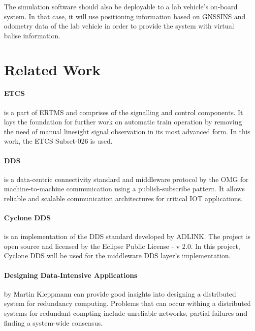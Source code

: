 \documentclass[a4paper, 12pt]{scrartcl}
\begin{document}
The simulation software should also be deployable to a lab vehicle's on-board system.
In that case, it will use positioning information based on \ac{GNSSINS} and odometry data of the lab vehicle in order to provide the system with virtual balise information.

\section*{Related Work}
\paragraph{\ac{ETCS}} is a part of \ac{ERTMS} and comprises of the signalling and control components.
It lays the foundation for further work on automatic train operation by removing the need of manual linesight signal observation in its most advanced form.
In this work, the \ac{ETCS} Subset-026 is used.
\vspace{-0.4cm}
\paragraph{\ac{DDS}} is a data-centric connectivity standard and middleware protocol by the \ac{OMG} for machine-to-machine communication using a publish-subscribe pattern.
It allows reliable and scalable communication architectures for critical \ac{IOT} applications.
\vspace{-0.4cm}
\paragraph{Cyclone DDS} is an implementation of the \ac{DDS} standard developed by ADLINK.
The project is open source and licensed by the Eclipse Public License - v 2.0.
In this project, Cyclone DDS will be used for the middleware \ac{DDS} layer's implementation.
\vspace{-0.4cm}
\paragraph{Designing Data-Intensive Applications} by Martin Kleppmann can provide good insights into designing a distributed system for redundancy computing.
Problems that can occur withing a distributed systems for redundant compting include unreliable networks, partial failures and finding a system-wide consensus.
\end{document}
